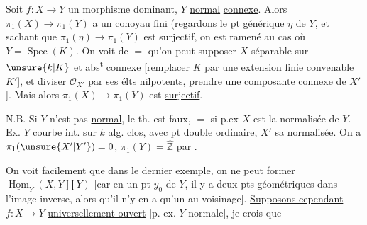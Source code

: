 Soit $f:X\to Y$ un morphisme  dominant, $Y$  \uline{normal} \uline{connexe}.
Alors $\pi_1(X)\to\pi_1(Y)$ a un conoyau fini
(regardons le pt générique $\eta$ de $Y$, et sachant que $\pi_1(\eta)\to\pi_1(Y)$ est surjectif, on est ramené au cas où $Y=\operatorname{Spec}(K)$.
On voit de $=$ qu'on peut supposer $X$ séparable sur $\unsure{k|K}$ et abs\textsuperscript{t} connexe
[remplacer $K$ par une extension  finie convenable $K'$], et diviser $\mathcal O_{X'}$ par ses élts nilpotents,  prendre une composante connexe de $X'$].
Mais alors $\pi_1(X)\longrightarrow\pi_1(Y)$ est \uline{surjectif}.


N.B. Si $Y$ n'est pas \uline{normal}, le th. est faux, $=$ si p.ex $X$ est la normalisée de $Y$.
Ex. $Y$ courbe int. sur $k$ alg. clos, avec pt double ordinaire, $X'$ sa normalisée.
On a $\pi_1(\unsure{X'|Y'})=0$, $\pi_1(Y)=\widehat{\mathbb Z}$
   par .


On voit facilement que dans le dernier exemple, on ne peut former $\underline{\operatorname{Hom}}_Y(X,Y\amalg Y)$
[car en un  pt $y_0$ de $Y$, il y a deux pts géométriques dans l'image inverse, alors qu'il n'y en a qu'un au voisinage].
\uline{Supposons cependant} $f:X\to Y$ \uline{universellement ouvert} [p. ex. $Y$ normale], je crois que
